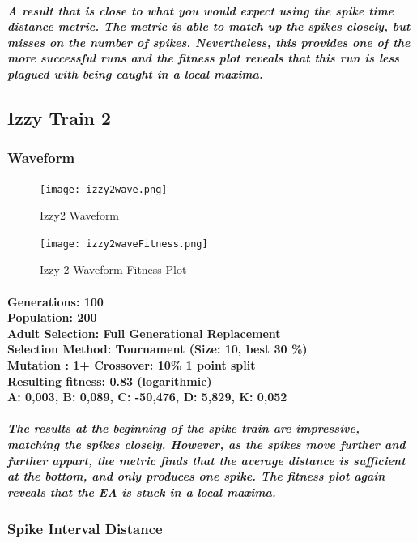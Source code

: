 \documentclass[titlepage,norsk]{article}
\begin{document}
\subparagraph{A result that is close to what you would expect using the spike time distance metric. The metric  is able to match up the spikes closely, but misses on the number of spikes. Nevertheless, this provides one of the more successful runs and the fitness plot reveals that this run is less plagued with being caught in a local maxima.
}
\subsection{Izzy Train 2}

\subsubsection{Waveform}

\begin{figure}[h!]
\centering
\texttt{[image: izzy2wave.png]}
\caption{Izzy2 Waveform}
\label{fig:awesome_image}
\end{figure}

\begin{figure}[h!]
\centering
\texttt{[image: izzy2waveFitness.png]}
\caption{Izzy 2 Waveform Fitness Plot}
\label{fig:awesome_image}
\end{figure}

\paragraph{
Generations: 100\\
Population: 200\\
Adult Selection: Full Generational Replacement\\
Selection Method: Tournament (Size: 10, best 30 \%) \\
Mutation : 1+%
Crossover: 10\% 1 point split \\
Resulting fitness: 0.83 (logarithmic) \\
 A: 0,003, B: 0,089, C: -50,476, D: 5,829, K: 0,052 \\
}

\subparagraph{The results at the beginning of the spike train are impressive, matching the spikes closely. However, as the spikes move further and further appart, the metric finds that the average distance is sufficient at the bottom, and only produces one spike. The fitness plot again reveals that the EA is stuck in a local maxima.}

\subsubsection{Spike Interval Distance}
\end{document}
